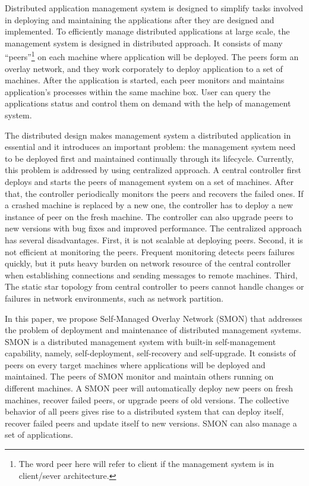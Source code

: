 Distributed application management system is designed to
simplify tasks involved in deploying and maintaining the
applications after they are designed and implemented.
To
efficiently manage distributed applications at large scale,
the management system is designed in distributed approach.
It consists of many ``peers''\footnote{The word peer here
will refer to client if the management system is in
client/sever architecture.} on each machine where
application will be deployed. The peers form an overlay
network, and they work corporately to deploy application to
a set of machines.  After the application is started, each
peer monitors and maintains application's processes within
the same machine box. User can query the applications status
and control them on demand with the help of management
system.

The distributed design makes management system a distributed
application in essential and it introduces an important
problem: the management system need to be deployed first and
maintained continually through its lifecycle. Currently,
this problem is addressed by using centralized approach. A
central controller first deploys and starts the peers of
management system on a set of machines. After that, the
controller periodically monitors the peers and recovers the
failed ones. If a crashed machine is replaced by a new one,
the controller has to deploy a new instance of peer on the
fresh machine. The controller can also upgrade peers to new
versions with bug fixes and improved performance. The
centralized approach has several disadvantages. First, it is
not scalable at deploying peers. Second, it is not efficient
at monitoring the peers. Frequent monitoring detects peers
failures quickly, but it puts heavy burden on network
resource of the central controller when establishing
connections and sending messages to remote machines. Third,
The static star topology from central controller to peers
cannot handle changes or failures in network
environments, such as network partition.

In this paper, we propose Self-Managed Overlay Network
(SMON) that addresses the problem of deployment and
maintenance of distributed management systems.  SMON is a
distributed management system with built-in self-management
capability, namely, self-deployment, self-recovery and
self-upgrade. It consists of peers on every target machines
where applications will be deployed and maintained. The
peers of SMON monitor and maintain others running on
different machines. A SMON peer will automatically deploy
new peers on fresh machines, recover failed peers, or
upgrade peers of old versions. The collective behavior of
all peers gives rise to a distributed system that can deploy
itself, recover failed peers and update itself to new
versions. SMON can also manage a set of applications.

